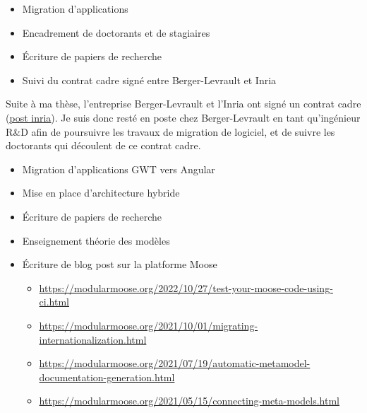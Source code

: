 \documentclass[10pt,a4paper,ragged2e,withhyper]{altacv}
\begin{document}
\newpage



\begin{itemize}
\item Migration d'applications
\item Encadrement de doctorants et de stagiaires
\item Écriture de papiers de recherche
\item Suivi du contrat cadre signé entre Berger-Levrault et Inria
\end{itemize}

Suite à ma thèse, l'entreprise Berger-Levrault et l'Inria ont signé un contrat cadre (\href{https://www.inria.fr/fr/berger-levrault-inria-partenariat-numerique-responsable}{\color{blue}\underline{post inria}}).
Je suis donc resté en poste chez Berger-Levrault en tant qu'ingénieur R\&D afin de poursuivre les travaux de migration de logiciel, et de suivre les doctorants qui découlent de ce contrat cadre.

\divider

\begin{itemize}
\item Migration d'applications GWT vers Angular
\item Mise en place d'architecture hybride
\item Écriture de papiers de recherche
\item Enseignement théorie des modèles
\item Écriture de blog post sur la platforme Moose
\begin{itemize}
  \item \url{https://modularmoose.org/2022/10/27/test-your-moose-code-using-ci.html}
  \item \url{https://modularmoose.org/2021/10/01/migrating-internationalization.html}
  \item \url{https://modularmoose.org/2021/07/19/automatic-metamodel-documentation-generation.html}
  \item \url{https://modularmoose.org/2021/05/15/connecting-meta-models.html}
\end{itemize}

\end{itemize}
\end{document}
